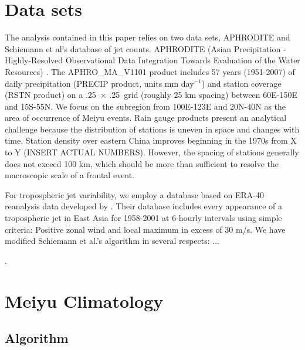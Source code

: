 \documentclass[draft,grl]{AGUTeX}
\begin{document}
\begin{article}
	
\section{Data sets}
	The analysis contained in this paper relies on two data sets, APHRODITE and Schiemann et al's database of jet counts. APHRODITE (Asian Precipitation - Highly-Resolved Observational Data Integration Towards Evaluation of the Water Resources) \citep{Yatagai2012}. The APHRO\_MA\_V1101 product includes 57 years (1951-2007) of daily precipitation (PRECIP product, units mm day$^{-1}$) and station coverage (RSTN product) on a .25\textdegree\ $\times$ .25\textdegree\ grid (roughly 25 km spacing) between 60\textdegree E-150\textdegree E and 15\textdegree S-55\textdegree N. We focus on the subregion from 100E-123E and 20N-40N as the area of occurrence of Meiyu events. Rain gauge products present an analytical challenge because the distribution of stations is uneven in space and changes with time. Station density over eastern China improves beginning in the 1970s from X to Y (INSERT ACTUAL NUMBERS). However, the spacing of stations generally does not exceed 100 km, which should be more than sufficient to resolve the macroscopic scale of a frontal event.

	For tropospheric jet variability, we employ a database based on ERA-40 reanalysis data developed by \citet{Schiemann2009}. Their database includes every appearance of a tropospheric jet in East Asia for 1958-2001 at 6-hourly intervals using simple criteria: Positive zonal wind and local maximum in excess of 30 m/s. We have modified Schiemann et al.'s algorithm in several respects: ...

.
	
\section{Meiyu Climatology}
\subsection{Algorithm}


\end{article}
\end{document}
